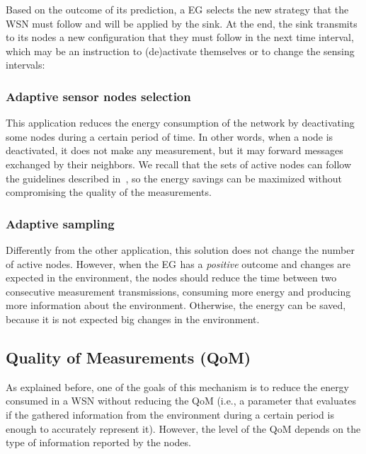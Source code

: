 \documentclass{llncs}
\newcommand{\EG}[1]{EG$_{\text{#1}}$}
\begin{document}
Based on the outcome of its prediction, a \EG{} selects the new strategy that 
the WSN must follow and will be applied by the sink. 
At the end, the sink transmits to its nodes a new configuration that they must 
follow in the next time interval, which may be an instruction to (de)activate 
themselves or to change the sensing intervals:

\subsubsection{Adaptive sensor nodes selection}

This application reduces the energy consumption of the network by deactivating 
some nodes during a certain period of time. In other words, when a node is 
deactivated, it does not make any measurement, but it may forward messages 
exchanged by their neighbors.
We recall that the sets of active nodes can follow the guidelines described 
in~\cite{Yann-Ael2005}, so the energy savings can be maximized without 
compromising the quality of the measurements.

\subsubsection{Adaptive sampling}

Differently from the other application, this solution does not change the 
number of active nodes. However, when the \EG{} has a \emph{positive} outcome 
and changes are expected in the environment, the nodes should reduce the 
time between two consecutive measurement transmissions, consuming more energy 
and producing more information about the environment. Otherwise, the energy can 
be saved, because it is not expected big changes in the environment.

\subsection{Quality of Measurements (QoM)}
\label{sec:qom}

As explained before, one of the goals of this mechanism is to reduce the 
energy consumed in a WSN without reducing the QoM (i.e., a parameter that 
evaluates if the gathered information from the environment during a certain 
period is enough to accurately represent it). However, the level of the QoM 
depends on the type of information reported by the nodes.
\end{document}
